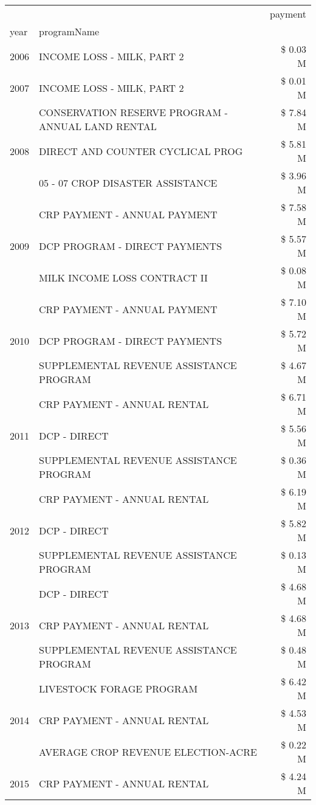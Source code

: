 \begin{tabular}{llr}
\toprule
 &  & payment \\
year & programName &  \\
\midrule
2006 & INCOME LOSS - MILK, PART 2 & \$ 0.03 M \\
\cline{1-3}
2007 & INCOME LOSS - MILK, PART 2 & \$ 0.01 M \\
\cline{1-3}
\multirow[t]{3}{*}{2008} & CONSERVATION RESERVE PROGRAM - ANNUAL LAND RENTAL & \$ 7.84 M \\
 & DIRECT AND COUNTER CYCLICAL PROG & \$ 5.81 M \\
 & 05 - 07 CROP DISASTER ASSISTANCE & \$ 3.96 M \\
\cline{1-3}
\multirow[t]{3}{*}{2009} & CRP PAYMENT - ANNUAL PAYMENT & \$ 7.58 M \\
 & DCP PROGRAM - DIRECT PAYMENTS & \$ 5.57 M \\
 & MILK INCOME LOSS CONTRACT II & \$ 0.08 M \\
\cline{1-3}
\multirow[t]{3}{*}{2010} & CRP PAYMENT - ANNUAL PAYMENT & \$ 7.10 M \\
 & DCP PROGRAM - DIRECT PAYMENTS & \$ 5.72 M \\
 & SUPPLEMENTAL REVENUE ASSISTANCE PROGRAM & \$ 4.67 M \\
\cline{1-3}
\multirow[t]{3}{*}{2011} & CRP PAYMENT - ANNUAL RENTAL & \$ 6.71 M \\
 & DCP - DIRECT & \$ 5.56 M \\
 & SUPPLEMENTAL REVENUE ASSISTANCE PROGRAM & \$ 0.36 M \\
\cline{1-3}
\multirow[t]{3}{*}{2012} & CRP PAYMENT - ANNUAL RENTAL & \$ 6.19 M \\
 & DCP - DIRECT & \$ 5.82 M \\
 & SUPPLEMENTAL REVENUE ASSISTANCE PROGRAM & \$ 0.13 M \\
\cline{1-3}
\multirow[t]{3}{*}{2013} & DCP - DIRECT & \$ 4.68 M \\
 & CRP PAYMENT - ANNUAL RENTAL & \$ 4.68 M \\
 & SUPPLEMENTAL REVENUE ASSISTANCE PROGRAM & \$ 0.48 M \\
\cline{1-3}
\multirow[t]{3}{*}{2014} & LIVESTOCK FORAGE PROGRAM & \$ 6.42 M \\
 & CRP PAYMENT - ANNUAL RENTAL & \$ 4.53 M \\
 & AVERAGE CROP REVENUE ELECTION-ACRE & \$ 0.22 M \\
\cline{1-3}
\multirow[t]{3}{*}{2015} & CRP PAYMENT - ANNUAL RENTAL & \$ 4.24 M \\

\end{tabular}
